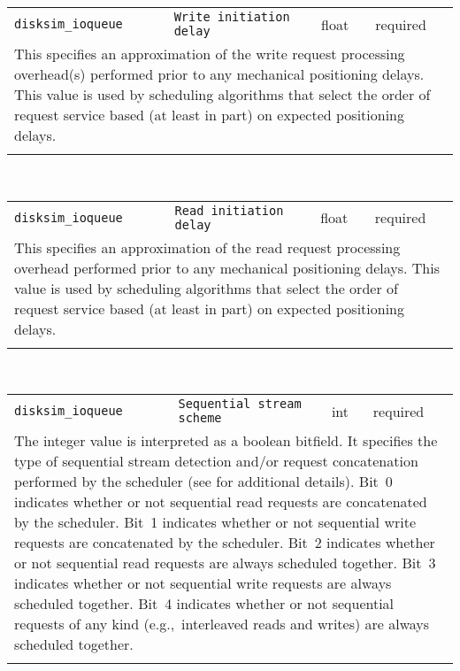 \noindent 
\begin{tabular}{|p{\lpmodwidth}|p{\lpnamewidth}|p{0.5in}|p{0.5in}|}
\cline{1-4}
\texttt{disksim\_ioqueue} & \texttt{Write initiation delay} & float & required \\ 
\cline{1-4}
\multicolumn{4}{|p{6in}|}{
This specifies an approximation of the write request processing
overhead(s) performed prior to any mechanical positioning delays.
This value is used by scheduling algorithms that select the order of
request service based (at least in part) on expected positioning
delays.
}\\ 
\cline{1-4}
\multicolumn{4}{p{5in}}{}\\
\end{tabular}\\ 
\noindent 
\begin{tabular}{|p{\lpmodwidth}|p{\lpnamewidth}|p{0.5in}|p{0.5in}|}
\cline{1-4}
\texttt{disksim\_ioqueue} & \texttt{Read initiation delay} & float & required \\ 
\cline{1-4}
\multicolumn{4}{|p{6in}|}{
This specifies an approximation of the read request processing
overhead performed prior to any mechanical positioning delays. This
value is used by scheduling algorithms that select the order of
request service based (at least in part) on expected positioning
delays.
}\\ 
\cline{1-4}
\multicolumn{4}{p{5in}}{}\\
\end{tabular}\\ 
\noindent 
\begin{tabular}{|p{\lpmodwidth}|p{\lpnamewidth}|p{0.5in}|p{0.5in}|}
\cline{1-4}
\texttt{disksim\_ioqueue} & \texttt{Sequential stream scheme} & int & required \\ 
\cline{1-4}
\multicolumn{4}{|p{6in}|}{
The integer value is interpreted as a boolean bitfield. It specifies
the type of sequential stream detection and/or request concatenation
performed by the scheduler (see \cite{Worthington95a} for additional
details).
Bit~0 indicates whether or not sequential read requests are
concatenated by the scheduler.
Bit~1 indicates whether or not sequential write requests are
concatenated by the scheduler.
Bit~2 indicates whether or not sequential read requests are always
scheduled together.
Bit~3 indicates whether or not sequential write requests are always
scheduled together.
Bit~4 indicates whether or not sequential requests of any kind
(e.g.,~interleaved reads and writes) are always scheduled together.
}\\ 
\cline{1-4}
\multicolumn{4}{p{5in}}{}\\
\end{tabular}\\ 
